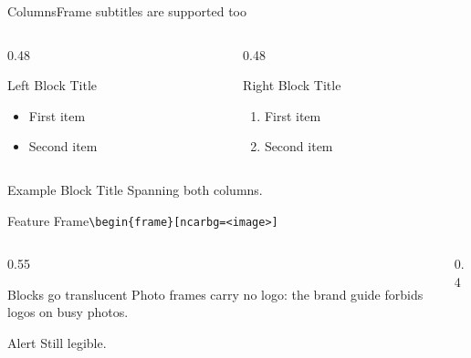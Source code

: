 \documentclass[aspectratio=\ncaraspectratio]{beamer}
\begin{document}
\begin{frame}[t]{Columns}{Frame subtitles are supported too}
  \begin{columns}[t]
    \begin{column}{0.48\textwidth}
      \begin{block}{Left Block Title}
        \begin{itemize}
        \item First item
        \item Second item
        \end{itemize}
      \end{block}
    \end{column}
    \begin{column}{0.48\textwidth}
      \begin{block}{Right Block Title}
        \begin{enumerate}
        \item First item
        \item Second item
        \end{enumerate}
      \end{block}
    \end{column}
  \end{columns}
  \begin{exampleblock}{Example Block Title}
    Spanning both columns.
  \end{exampleblock}
\end{frame}

\begin{frame}[ncarbg=images/wallpaper/mesa_lab.jpg]{Feature Frame}{\texttt{\textbackslash begin\{frame\}[ncarbg=<image>]}}
  \vfill
  \begin{columns}
    \begin{column}{0.55\textwidth}
      \begin{block}{Blocks go translucent}
        Photo frames carry no logo: the brand guide forbids logos on busy photos.
      \end{block}
      \begin{alertblock}{Alert}
        Still legible.
      \end{alertblock}
    \end{column}
    \begin{column}{0.4\textwidth}\end{column}
  \end{columns}
\end{frame}

\end{document}
